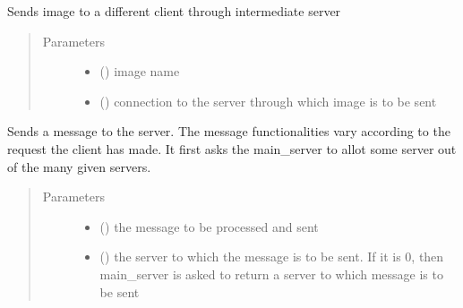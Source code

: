 \documentclass[letterpaper,10pt,english]{sphinxmanual}
\begin{document}

\begin{fulllineitems}
\label{\detokenize{client:client.send_image}}
Sends image to a different client through intermediate server
\begin{quote}\begin{description}
\item[{Parameters}] \leavevmode\begin{itemize}
\item {} 
 () \textendash{} image name

\item {} 
 () \textendash{} connection to the server through which image is to be sent

\end{itemize}

\end{description}\end{quote}

\end{fulllineitems}


\begin{fulllineitems}
\label{\detokenize{client:client.send_text}}
Sends a message to the server. The message functionalities vary according to the request the client has made. It first asks the main\_server to allot some server out of the many given servers.
\begin{quote}\begin{description}
\item[{Parameters}] \leavevmode\begin{itemize}
\item {} 
 () \textendash{} the message to be processed and sent

\item {} 
 () \textendash{} the server to which the message is to be sent. If it is 0, then main\_server is asked to return a server to which message is to be sent

\end{itemize}

\end{description}\end{quote}

\end{fulllineitems}
\end{document}
